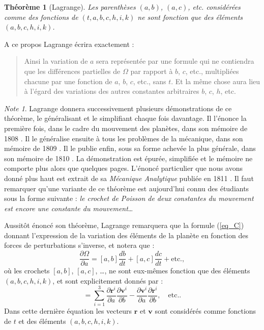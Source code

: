 \documentclass[12pt,paperletter, reqno]{amsart}
\newcommand{\rr}{\mathbf{r}}
\newcommand{\vv}{\mathbf{v}}
\theoremstyle{plain}
\newtheorem{theoreme}{Théorème}
\theoremstyle{remark}
\newtheorem*{note}{Note}
\begin{document}
  \begin{theoreme}[Lagrange]
    Les parenthèses $(a,b)$, $(a,c)$, etc. considérées comme des fonctions de $(t,a,b,c,h,i,k)$ ne sont fonction que des éléments $(a,b,c,h,i,k)$.
  \end{theoreme}
  
  A ce propos Lagrange écrira exactement \cite[volume II page 73]{Lagrange1} :
  \begin{quote}
    \og Ainsi la variation de $a$ sera représentée par une formule qui ne contiendra que les différences partielles de $\Omega$ par rapport à $b$, $c$, etc., multipliées chacune par une fonction de $a$, $b$, $c$, etc., sans $t$. Et la même chose aura lieu à l'égard des variations des autres constantes arbitraires $b$, $c$, $h$, etc.\fg{}
  \end{quote}
  
  \begin{note}
    Lagrange donnera successivement plusieurs démonstrations de ce théorème,
    le généralisant et le simplifiant chaque fois davantage.
    Il l'énonce la première fois,
    dans le cadre du mouvement des planètes,
    dans son mémoire de 1808 \cite{Lagrange2}.
    Il le généralise ensuite à tous les problèmes de la mécanique,
    dans son mémoire de 1809 \cite{Lagrange3}.
    Il le publie enfin,
    sous sa forme achevée la plus générale,
    dans son mémoire de 1810 \cite{Lagrange4}.
    La démonstration est épurée,
    simplifiée et le mémoire ne comporte plus alors que quelques pages.
    L'énoncé particulier que nous avons donné plus haut est extrait de sa \emph{Mécanique Analytique} publiée en 1811 \cite{Lagrange1}.
    Il faut remarquer qu'une variante de ce théorème est aujourd'hui connu des étudiants sous la forme suivante :
    \emph{le crochet de Poisson de deux constantes du mouvement est encore une constante du mouvement}\ldots
  \end{note}
  
  Aussitôt énoncé son théorème,
  Lagrange remarquera que la formule (\ref{eq_C}) donnant l'expression de la variation des éléments de la planète en fonction des forces de perturbations s'inverse,
  et notera que :
  \begin{equation}\label{eq_D}
    \frac{\partial \Omega}{\partial a} = [a,b] \frac{db}{dt} + [a,c]\frac{dc}{dt} + \mbox{etc.},
  \end{equation}
  où les crochets $[a,b]$, $[a,c]$, \ldots, ne sont eux-mêmes fonction que des éléments $(a,b,c,h,i,k)$,
  et sont explicitement donnés par :
  \begin{equation}
    [a,b] = \sum_{i=1}^3\frac{\partial \rr^i}{\partial a}\frac{\partial \vv^i}{\partial b} -  \frac{\partial \vv^i}{\partial a}\frac{\partial \rr^i}{\partial b},\quad \mbox{etc.}.
  \end{equation}
  Dans cette dernière équation les vecteurs $\rr$ et $\vv$ sont considérés comme fonctions de $t$ et des éléments $(a,b,c,h,i,k)$.
  
\end{document}
